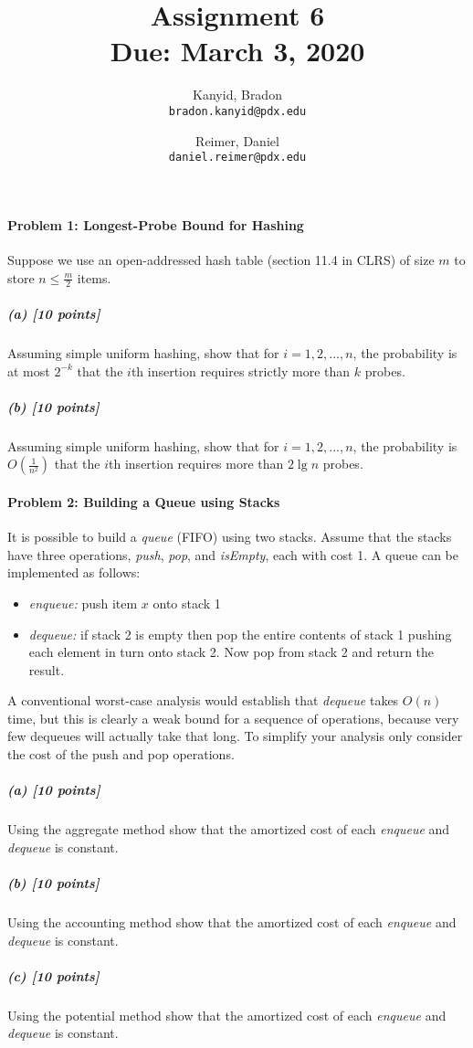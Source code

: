 \documentclass[11pt]{article}
\title{\bf Assignment 6 \\[2ex]
\rm\normalsize Due: March 3, 2020}
\date{}
\author{
  Kanyid, Bradon\\
  \texttt{bradon.kanyid@pdx.edu}
  \and
  Reimer, Daniel\\
  \texttt{daniel.reimer@pdx.edu}
}
\begin{document}
\maketitle

\paragraph{Problem 1: Longest-Probe Bound for Hashing}
Suppose we use an open-addressed hash table (section 11.4 in CLRS) of size $m$ to store $n \leq \frac m2$ items.

\subparagraph{(a) [10 points]}
Assuming simple uniform hashing, show that for $i = 1,2,...,n$, the probability is at most $2^{-k}$ that the $i$th
insertion requires strictly more than $k$ probes.



\subparagraph{(b) [10 points]}
Assuming simple uniform hashing, show that for $i = 1,2,...,n$, the probability is $O(\frac 1{n^2})$ that the
$i$th insertion requires more than $2 \lg n$ probes.



\paragraph{Problem 2: Building a Queue using Stacks}
It is possible to build a {\em queue} (FIFO) using two stacks. Assume that the stacks have three operations, {\em push}, {\em pop}, and {\em isEmpty}, each with cost 1. A queue can be implemented as follows:
\begin{itemize}
\item {\em enqueue:} push item $x$ onto stack 1
\item {\em dequeue:} if stack 2 is empty then pop the entire contents of stack 1 pushing each element in turn onto stack 2. Now pop from stack 2 and return the result.
\end{itemize}
A conventional worst-case analysis would establish that {\em dequeue} takes $O(n)$ time, but this is clearly a weak bound for a sequence of operations, because very few dequeues will actually take that long. To simplify your analysis only consider the cost of the push and pop operations.

\subparagraph{(a) [10 points]}
Using the aggregate method show that the amortized cost of each {\em enqueue} and {\em dequeue} is constant.



\subparagraph{(b) [10 points]}
Using the accounting method show that the amortized cost of each {\em enqueue} and {\em dequeue} is constant.



\subparagraph{(c) [10 points]}
Using the potential method show that the amortized cost of each {\em enqueue} and {\em dequeue} is constant.


\end{document}
